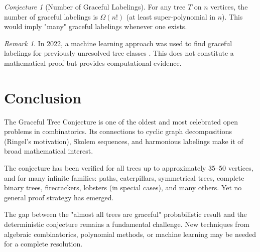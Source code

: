 \documentclass[12pt,a4paper]{amsart}
\theoremstyle{definition}
\theoremstyle{remark}
\newtheorem{remark}[theorem]{Remark}
\newtheorem{conjecture}[theorem]{Conjecture}
\begin{document}
\begin{conjecture}[Number of Graceful Labelings]\label{conj:count}
For any tree $T$ on $n$ vertices, the number of graceful labelings is
$\Omega(n!)$ (at least super-polynomial in $n$). This would imply "many" graceful
labelings whenever one exists.
\end{conjecture}

\begin{remark}
In 2022, a machine learning approach was used to find graceful labelings for
previously unresolved tree classes \cite{Cappart2022}. This does not constitute
a mathematical proof but provides computational evidence.
\end{remark}

\section{Conclusion}

The Graceful Tree Conjecture is one of the oldest and most celebrated open problems
in combinatorics. Its connections to cyclic graph decompositions (Ringel's motivation),
Skolem sequences, and harmonious labelings make it of broad mathematical interest.

The conjecture has been verified for all trees up to approximately 35--50 vertices,
and for many infinite families: paths, caterpillars, symmetrical trees, complete
binary trees, firecrackers, lobsters (in special cases), and many others. Yet no
general proof strategy has emerged.

The gap between the "almost all trees are graceful" probabilistic result and the
deterministic conjecture remains a fundamental challenge. New techniques from
algebraic combinatorics, polynomial methods, or machine learning may be needed
for a complete resolution.
\end{document}
